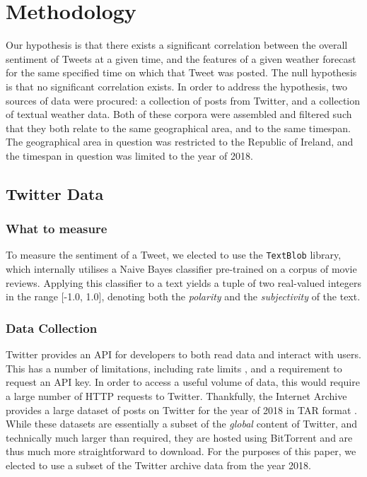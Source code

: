 \documentclass[a4paper,10pt]{article}
\begin{document}
    \section{Methodology}

    Our hypothesis is that there exists a significant correlation between the overall sentiment of Tweets at a given time, and the features of a given weather forecast for the same specified time on which that Tweet was posted. The null hypothesis is that no significant correlation exists. In order to address the hypothesis, two sources of data were procured: a collection of posts from Twitter, and a collection of textual weather data. Both of these corpora were assembled and filtered such that they both relate to the same geographical area, and to the same timespan. The geographical area in question was restricted to the Republic of Ireland, and the timespan in question was limited to the year of 2018. 

    \subsection{Twitter Data}

    \subsubsection{What to measure}

    To measure the sentiment of a Tweet, we elected to use the \texttt{TextBlob}  library, which internally utilises a Naive Bayes classifier pre-trained on a corpus of movie reviews. Applying this classifier to a text yields a tuple of two real-valued integers in the range [-1.0, 1.0], denoting both the \textit{polarity} and the \textit{subjectivity} of the text.

    \subsubsection{Data Collection}

    Twitter provides an API for developers to both read data and interact with users. This has a number of limitations, including rate limits , and a requirement to request an API key. In order to access a useful volume of data, this would require a large number of HTTP requests to Twitter. Thankfully, the Internet Archive provides a large dataset of posts on Twitter for the year of 2018 in TAR format . While these datasets are essentially a subset of the \textit{global} content of Twitter, and technically much larger than required, they are hosted using BitTorrent and are thus much more straightforward to download. For the purposes of this paper, we elected to use a subset of the Twitter archive data from the year 2018.
\end{document}
